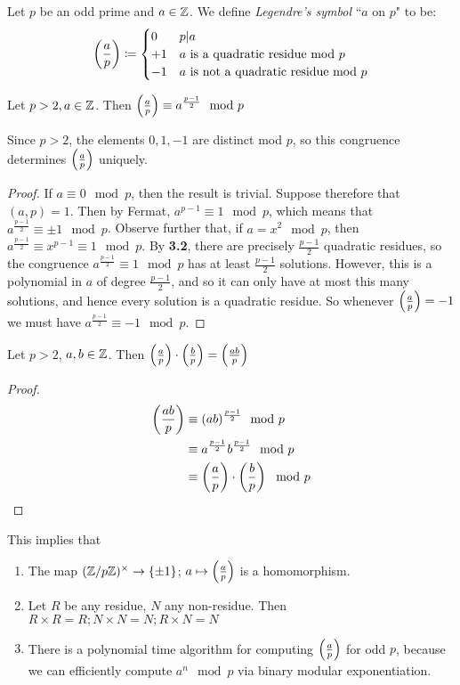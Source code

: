 \documentclass[10pt,a4paper]{article}
\begin{document}
Let $p$ be an odd prime and $a\in\mathbb{Z}$. We define \emph{Legendre's symbol} ``$a$ on $p$" to be:
\begin{align*}
\legendre{a}{p} \coloneqq \begin{cases} 0 & p|a \\ +1 & a $ is a quadratic residue mod $p \\ -1 & a $ is not a quadratic residue mod $p\end{cases}
\end{align*}

\begin{theorem}
Let $p>2, a \in \mathbb{Z}$. Then $\left(\frac{a}{p}\right) \equiv a^{\frac{p-1}{2}} \mod p$
\end{theorem}
Since $p>2$, the elements $0,1,-1$ are distinct mod $p$, so this congruence determines $\left(\frac{a}{p}\right)$ uniquely.
\begin{proof}
If $a \equiv 0 \mod p$, then the result is trivial. Suppose therefore that $(a,p) = 1$. Then by Fermat, $a^{p-1} \equiv 1 \mod p$, which means that $a^{\frac{p-1}{2}} \equiv \pm 1 \mod p$. Observe further that, if $a = x^2 \mod p$, then $a^{\frac{p-1}{2}} \equiv x^{p-1} \equiv 1 \mod p$.
By \textbf{3.2}, there are precisely $\frac{p-1}{2}$ quadratic residues, so the congruence $a^{\frac{p-1}{2}} \equiv 1 \mod p$ has at least $\frac{p-1}{2}$ solutions. However, this is a polynomial in $a$ of degree $\frac{p-1}{2}$, and so it can only have at most this many solutions, and hence every solution is a quadratic residue. So whenever $\left(\frac{a}{p}\right) = -1$ we must have $a^{\frac{p-1}{2}} \equiv -1 \mod p$.
\end{proof}
\begin{corollary}
Let $p>2$, $a,b \in \mathbb{Z}$. Then $\left(\frac{a}{p}\right)\cdot \left(\frac{b}{p}\right) = \left(\frac{ab}{p}\right)$
\end{corollary}
\begin{proof}
\begin{align*}
\left(\frac{ab}{p}\right) &\equiv (ab)^{\frac{p-1}{2}} \mod p\\
&\equiv a^{\frac{p-1}{2}}b^{\frac{p-1}{2}} \mod p\\
&\equiv \left(\frac{a}{p}\right)\cdot \left(\frac{b}{p}\right) \mod p
\end{align*}
\end{proof}
This implies that
\begin{enumerate}
\item The map $(\mathbb{Z}/p\mathbb{Z})^\times \to \{\pm 1\}$; $a\mapsto \left(\frac{a}{p}\right)$ is a homomorphism.
\item Let $R$ be any residue, $N$ any non-residue. Then $R\times R = R; N\times N = N; R\times N = N$
\item There is a polynomial time algorithm for computing $\left(\frac{a}{p}\right)$ for odd $p$, because we can efficiently compute $a^n \mod p$ via binary modular exponentiation.
\end{enumerate}
\end{document}
